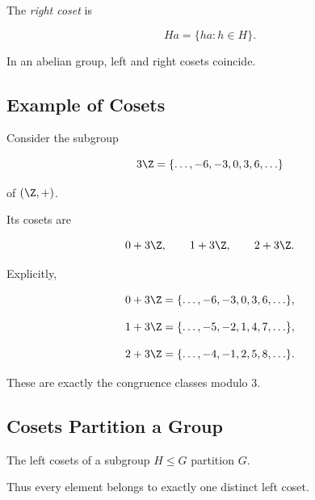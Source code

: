 The \emph{right coset} is

\[ Ha=\{ha:h\in H\}. \]

In an abelian group, left and right cosets coincide.

\subsection{Example of Cosets}
\label{subsec:coset-example}

Consider the subgroup

\[ 3\Z=\{\ldots,-6,-3,0,3,6,\ldots\} \]

of \((\Z,+)\).

Its cosets are

\[ 0+3\Z,\qquad1+3\Z,\qquad2+3\Z. \]

Explicitly,

\[ 0+3\Z=\{\ldots,-6,-3,0,3,6,\ldots\}, \]

\[ 1+3\Z=\{\ldots,-5,-2,1,4,7,\ldots\}, \]

\[ 2+3\Z=\{\ldots,-4,-1,2,5,8,\ldots\}. \]

These are exactly the congruence classes modulo \(3\).

\subsection{Cosets Partition a Group}
\label{subsec:cosets-partition}

\begin{theorem}
The left cosets of a subgroup \(H\leq G\) partition \(G\).
\end{theorem}

Thus every element belongs to exactly one distinct left coset.

\begin{center}
\end{center}

